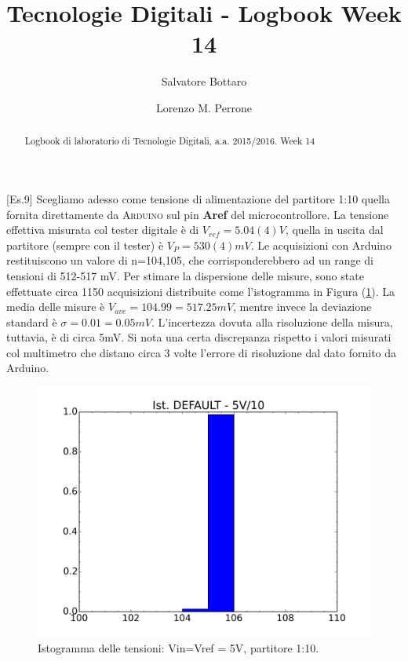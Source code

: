 \documentclass[journal, a4paper]{IEEEtran}
\begin{document}
	\title{Tecnologie Digitali - Logbook Week 14}
	\author[1]{Salvatore Bottaro}
		\author[2]{Lorenzo M. Perrone}
	\maketitle
	
\begin{abstract}
	Logbook di laboratorio di Tecnologie Digitali, a.a. 2015/2016. Week 14
\end{abstract}

[Es.9] Scegliamo adesso come tensione di alimentazione del partitore 1:10 quella fornita direttamente da \textsc{Arduino} sul pin \textbf{Aref} del microcontrollore. La tensione effettiva misurata col tester digitale è di $V_{ref} = 5.04(4) \si{V}$, quella in uscita dal partitore (sempre con il tester) è $V_P = 530(4) \si{mV}$. Le acquisizioni con Arduino restituiscono un valore di n={104,105}, che corrisponderebbero ad un range di tensioni di 512-517 mV. Per stimare la dispersione delle misure, sono state effettuate circa 1150 acquisizioni distribuite come l'istogramma in Figura (\ref{fig:ist_DEFAULT_part105V}). La media delle misure è $V_{ave} = 104.99 = 517.25 \si{mV}$, mentre invece la deviazione standard è $\sigma = 0.01 = 0.05 \si{mV}$. L'incertezza dovuta alla risoluzione della misura, tuttavia, è di circa 5mV. Si nota una certa discrepanza rispetto i valori misurati col multimetro che distano circa 3 volte l'errore di risoluzione dal dato fornito da Arduino.\\

\begin{figure}
\centering
\includegraphics[width=0.9\linewidth]{./ist_DEFAULT_part105V}
\caption{Istogramma delle tensioni: Vin=Vref = 5V, partitore 1:10.}
\label{fig:ist_DEFAULT_part105V}
\end{figure}
\end{document}
